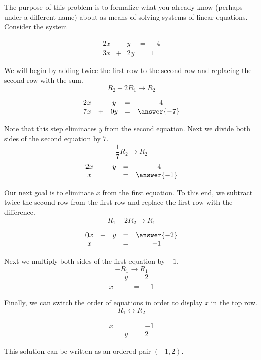 \documentclass{ximera}
\begin{document}
\begin{exploration}\label{init:systwoeqs1} The purpose of this problem is to formalize what you already know (perhaps under a different name) about  as means of solving systems of linear equations.  Consider the system

$$\begin{matrix}
      2x& -&y&=&-4\\
      3x & +&2y&= &1 
    \end{matrix}$$

We will begin by adding twice the first row to the second row and replacing the second row with the sum. $$R_2+2R_1\rightarrow R_2$$

$$ \begin{matrix}
      2x& -&y&=&-4\\
      7x & +&0y&= &\answer{-7}  
    \end{matrix}$$

Note that this step eliminates $y$ from the second equation.  Next we divide both sides of the second equation by $7$. $$\frac{1}{7}R_2\rightarrow R_2$$
$$\begin{matrix}
       2x& -&y&=&-4\\
      x & &&= &\answer{-1}
	   \end{matrix}$$
  
Our next goal is to eliminate $x$ from the first equation.  To this end, we subtract twice the second row from the first row and replace the first row with the difference. $$R_1-2R_2\rightarrow R_1$$

$$\begin{matrix}
	 0x& -&y&=&\answer{-2}\\
     x & &&= &-1 \\
    \end{matrix}$$

Next we multiply both sides of the first equation by $-1$. $$-R_1\rightarrow R_1$$
$$\begin{matrix}
      & &y&=&2\\
      x & &&= &-1
    \end{matrix}$$
 
    
Finally, we can switch the order of equations in order to display $x$ in the top row. $$R_1\leftrightarrow R_2$$  

$$\begin{matrix}
      x & &&= &-1\\
      & &y&=&2      
    \end{matrix}$$
  
This solution can be written as an ordered pair $(-1, 2)$.  
\end{exploration}
\end{document}
